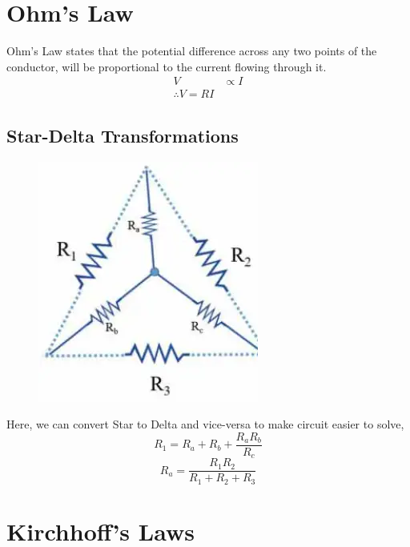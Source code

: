 	\section{Ohm's Law}
	Ohm's Law states that the potential difference across any two points of the conductor, will be proportional to the current flowing through it.
	\[\begin{split}
		V&\propto I\\
		\therefore V=RI
	\end{split}\]
	\subsection{Star-Delta Transformations}
	\begin{figure}[H]
		\centering
		\includegraphics[scale=0.5]{Star-Delta_img.png}
	\end{figure}
	Here, we can convert Star to Delta and vice-versa to make circuit easier to solve,
	\[R_1=R_a+R_b+\frac{R_aR_b}{R_c}\]
	\[R_a=\frac{R_1R_2}{R_1+R_2+R_3}\]
	\section{Kirchhoff's Laws}
